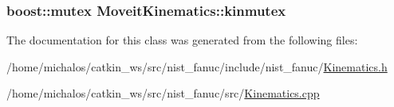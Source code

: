 \hypertarget{classMoveitKinematics_a94dd916f6d9a7074ebd00356975d51ea}{
\subsubsection[{kinmutex}]{\setlength{\rightskip}{0pt plus 5cm}boost\-::mutex Moveit\-Kinematics\-::kinmutex}}\label{classMoveitKinematics_a94dd916f6d9a7074ebd00356975d51ea}


The documentation for this class was generated from the following files\-:\begin{DoxyCompactItemize}
\item 
/home/michalos/catkin\-\_\-ws/src/nist\-\_\-fanuc/include/nist\-\_\-fanuc/\hyperlink{Kinematics_8h}{Kinematics.\-h}\item 
/home/michalos/catkin\-\_\-ws/src/nist\-\_\-fanuc/src/\hyperlink{Kinematics_8cpp}{Kinematics.\-cpp}\end{DoxyCompactItemize}
